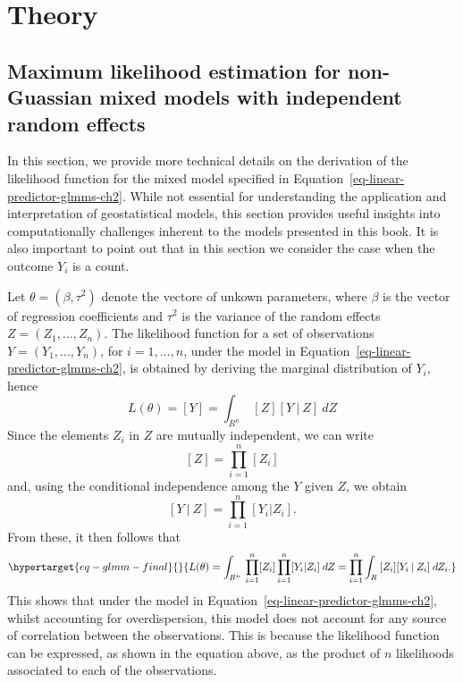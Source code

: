 \documentclass[
  letterpaper,
]{krantz}
\begin{document}
\hypertarget{theory}{%
\section{Theory}\label{theory}}

\hypertarget{maximum-likelihood-estimation-for-non-guassian-mixed-models-with-independent-random-effects}{%
\subsection{Maximum likelihood estimation for non-Guassian mixed models
with independent random
effects}\label{maximum-likelihood-estimation-for-non-guassian-mixed-models-with-independent-random-effects}}

In this section, we provide more technical details on the derivation of
the likelihood function for the mixed model specified in
Equation~\ref{eq-linear-predictor-glmms-ch2}. While not essential for
understanding the application and interpretation of geostatistical
models, this section provides useful insights into computationally
challenges inherent to the models presented in this book. It is also
important to point out that in this section we consider the case when
the outcome \(Y_i\) is a count.

Let \(\theta = (\beta, \tau^2)\) denote the vectore of unkown
parameters, where \(\beta\) is the vector of regression coefficients and
\(\tau^2\) is the variance of the random effects
\(Z = (Z_1, \ldots, Z_n)\). The likelihood function for a set of
observations \(Y = (Y_1, \ldots, Y_n)\), for \(i=1,\ldots,n\), under the
model in Equation~\ref{eq-linear-predictor-glmms-ch2}, is obtained by
deriving the marginal distribution of \(Y_i\), hence \[
L(\theta) = [Y] = \int_{R^n} \: [Z] [Y \:|\: Z] \: d Z
\] Since the elements \(Z_i\) in \(Z\) are mutually independent, we can
write \[
[Z] = \prod_{i=1}^n [Z_i]
\] and, using the conditional independence among the \(Y\) given \(Z\),
we obtain \[
[Y \:|\: Z] = \prod_{i=1}^n [Y_i | Z_i].
\] From these, it then follows that
\begin{equation}\protect\hypertarget{eq-glmm-final}{}{
L(\theta) = \int_{R^n} \: \prod_{i=1}^n [Z_i] \prod_{i=1}^n [Y_i | Z_i] \: d Z = \prod_{i=1}^n \int_{R} \: [Z_i] [Y_i \:|\: Z_i] \: d Z_i.
}\label{eq-glmm-final}\end{equation} This shows that under the model in
Equation~\ref{eq-linear-predictor-glmms-ch2}, whilst accounting for
overdispersion, this model does not account for any source of
correlation between the observations. This is because the likelihood
function can be expressed, as shown in the equation above, as the
product of \(n\) likelihoods associated to each of the observations.
\end{document}
